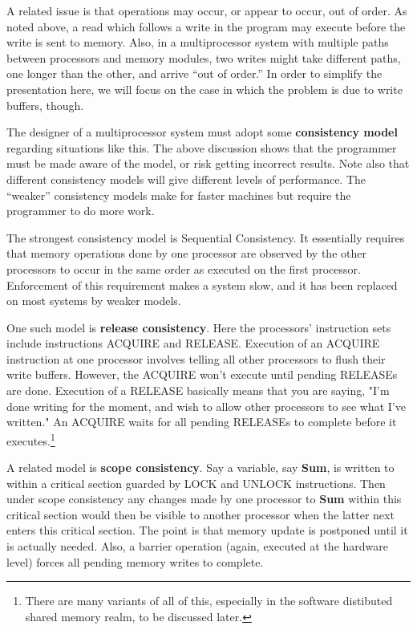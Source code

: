 A related issue is that operations may occur, or appear to occur, out of
order.  As noted above, a read which follows a write in the program may
execute before the write is sent to memory.  Also, in a multiprocessor
system with multiple paths between processors and memory modules, two
writes might take different paths, one longer than the other, and arrive
``out of order.''  In order to simplify the presentation here, we will
focus on the case in which the problem is due to write buffers, though.

The designer of a multiprocessor system must adopt some {\bf consistency
model} regarding situations like this.  The above discussion shows that
the programmer must be made aware of the model, or risk getting
incorrect results.  Note also that different consistency models will
give different levels of performance.  The ``weaker'' consistency models
make for faster machines but require the programmer to do more work.

The strongest consistency model is Sequential Consistency.  It
essentially requires that memory operations done by one processor
are observed by the other processors to occur in the same order as
executed on the first processor.  Enforcement of this requirement makes
a system slow, and it has been replaced on most systems by weaker
models.

One such model is {\bf release consistency}.  Here the processors' instruction
sets include instructions ACQUIRE and RELEASE.  Execution of an ACQUIRE
instruction at one processor involves telling all other processors to
flush their write buffers.  However, the ACQUIRE won't execute until
pending RELEASEs are done.  Execution of a RELEASE basically means that
you are saying, "I'm done writing for the moment, and wish to allow
other processors to see what I've written."  An ACQUIRE waits for all
pending RELEASEs to complete before it executes.\footnote{There are many
variants of all of this, especially in the software distibuted shared
memory realm, to be discussed later.}  

A related model is {\bf scope consistency}.  Say a variable, say {\bf
Sum}, is written to within a critical section guarded by LOCK and UNLOCK
instructions.  Then under scope consistency any changes made by one
processor to {\bf Sum} within this critical section would then be
visible to another processor when the latter next enters this critical
section.  The point is that memory update is postponed until it is
actually needed.  Also, a barrier operation (again, executed at the
hardware level) forces all pending memory writes to complete.

